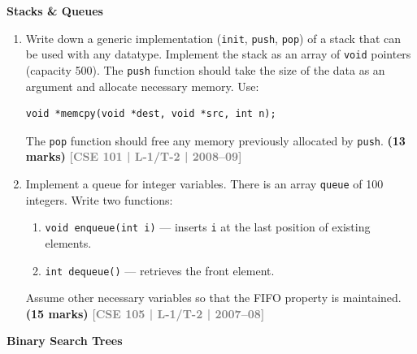 \documentclass[12pt,a3paper]{article}
\newcommand{\yr}[1]{\hfill\textcolor{gray}{\small\textbf{[#1]}}}
\newcommand{\mk}[1]{\textcolor{orange!70!black}{\small\textbf{(#1 marks)}}}
\newcommand{\subtopic}[2]{%
  \vspace{10pt}
  \noindent\begin{tcolorbox}[colback=#1!8,colframe=#1,boxrule=0.6pt,arc=4pt,
    left=6pt,right=6pt,top=4pt,bottom=4pt]
    \small\bfseries\textcolor{#1}{#2}
  \end{tcolorbox}
  \vspace{2pt}
}
\begin{document}
\subtopic{cE}{Stacks \& Queues}
\label{sub:s10-stackqueue}

\begin{enumerate}
\item Write down a generic implementation (\texttt{init}, \texttt{push}, \texttt{pop}) of a stack that can be used with any datatype. Implement the stack as an array of \texttt{void} pointers (capacity 500). The \texttt{push} function should take the size of the data as an argument and allocate necessary memory. Use:
\begin{lstlisting}
void *memcpy(void *dest, void *src, int n);
\end{lstlisting}
The \texttt{pop} function should free any memory previously allocated by \texttt{push}.
\mk{13} \yr{CSE 101 | L-1/T-2 | 2008--09}

\item Implement a queue for integer variables. There is an array \texttt{queue} of 100 integers. Write two functions:
\begin{enumerate}
  \item \texttt{void enqueue(int i)} --- inserts \texttt{i} at the last position of existing elements.
  \item \texttt{int dequeue()} --- retrieves the front element.
\end{enumerate}
Assume other necessary variables so that the FIFO property is maintained.
\mk{15} \yr{CSE 105 | L-1/T-2 | 2007--08}

\end{enumerate}

\subtopic{cE}{Binary Search Trees}
\label{sub:s10-bst}
\end{document}
